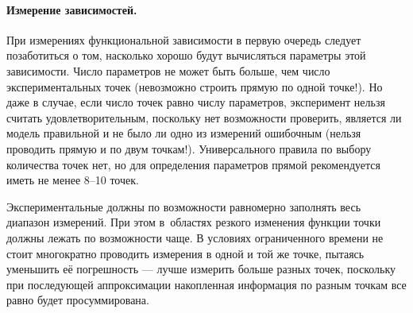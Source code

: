 

\paragraph{Измерение зависимостей.}
При измерениях функциональной зависимости в первую очередь следует позаботиться
о том, насколько хорошо будут вычисляться параметры этой зависимости.
Число параметров не может быть больше, чем число экспериментальных точек
(невозможно строить прямую по одной точке!). Но даже в случае, если число точек равно числу параметров, эксперимент нельзя считать удовлетворительным, поскольку нет возможности проверить, является ли модель правильной и не было ли одно из
измерений ошибочным (нельзя проводить прямую и по двум точкам!). Универсального правила по выбору количества точек нет, но для
определения параметров прямой рекомендуется иметь не менее 8--10 точек. 

Экспериментальные  должны по возможности равномерно заполнять весь диапазон измерений. При этом в~областях резкого изменения функции точки должны лежать по возможности чаще.
В условиях ограниченного времени не стоит многократно проводить измерения в одной и той же точке, пытаясь уменьшить её погрешность --- лучше измерить больше разных точек, поскольку при последующей аппроксимации накопленная информация по разным точкам все равно будет просуммирована.

